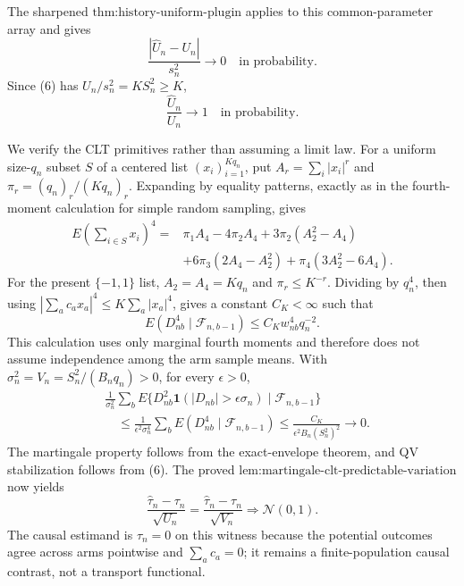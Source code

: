 The sharpened \(\text{thm:history-uniform-plugin}\) applies to this common-parameter array and gives
\[
\frac{|\widehat U_n-U_n|}{s_n^2}\longrightarrow0
\quad\text{in probability}.
\tag{8}
\]
Since (6) has \(U_n/s_n^2=KS_n^2\ge K\),
\[
\frac{\widehat U_n}{U_n}\longrightarrow1
\quad\text{in probability}.
\tag{9}
\]

We verify the CLT primitives rather than assuming a limit law. For a uniform size-\(q_n\) subset \(S\) of a centered list \((x_i)_{i=1}^{Kq_n}\), put \(A_r=\sum_i|x_i|^r\) and
\(\pi_r=(q_n)_r/(Kq_n)_r\). Expanding by equality patterns, exactly as in the fourth-moment calculation for simple random sampling, gives
\[
\begin{aligned}
E\left(\sum_{i\in S}x_i\right)^4
={}&\pi_1A_4-4\pi_2A_4+3\pi_2(A_2^2-A_4)\\
&+6\pi_3(2A_4-A_2^2)+\pi_4(3A_2^2-6A_4).
\end{aligned}
\tag{10}
\]
For the present \(\{-1,1\}\) list, \(A_2=A_4=Kq_n\) and \(\pi_r\le K^{-r}\). Dividing by \(q_n^4\), then using
\(|\sum_ac_ax_a|^4\le K\sum_a|x_a|^4\), gives a constant \(C_K<\infty\) such that
\[
E(D_{nb}^4\mid\mathcal F_{n,b-1})\le C_Kw_{nb}^4q_n^{-2}.
\tag{11}
\]
This calculation uses only marginal fourth moments and therefore does not assume independence among the arm sample means. With \(\sigma_n^2=V_n=S_n^2/(B_nq_n)>0\), for every \(\epsilon>0\),
\[
\begin{aligned}
&\frac1{\sigma_n^2}\sum_bE\{D_{nb}^2\mathbf1(|D_{nb}|>\epsilon\sigma_n)
\mid\mathcal F_{n,b-1}\}\\
&\quad\le\frac1{\epsilon^2\sigma_n^4}\sum_bE(D_{nb}^4\mid\mathcal F_{n,b-1})
\le\frac{C_K}{\epsilon^2B_n(S_n^2)^2}\longrightarrow0.
\end{aligned}
\tag{12}
\]
The martingale property follows from the exact-envelope theorem, and QV stabilization follows from (6). The proved
\(\text{lem:martingale-clt-predictable-variation}\) now yields
\[
\frac{\widehat\tau_n-\tau_n}{\sqrt{U_n}}
=\frac{\widehat\tau_n-\tau_n}{\sqrt{V_n}}
\Rightarrow\mathcal N(0,1).
\tag{13}
\]
The causal estimand is \(\tau_n=0\) on this witness because the potential outcomes agree across arms pointwise and \(\sum_ac_a=0\); it remains a finite-population causal contrast, not a transport functional.

